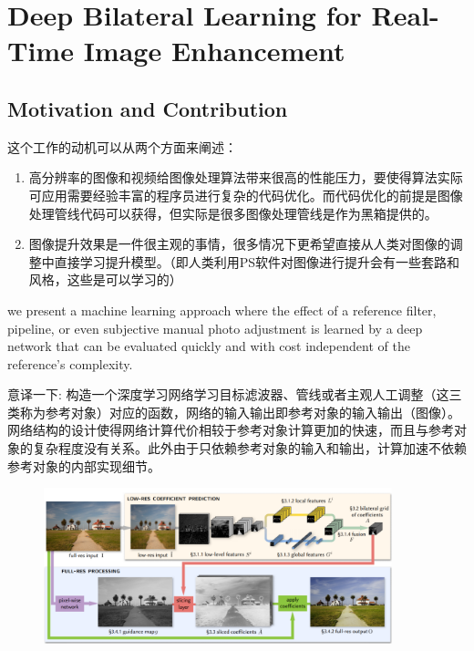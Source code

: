 \section{Deep Bilateral Learning for Real-Time Image Enhancement}
\label{sec:gharbi2017deep}

\subsection{Motivation and Contribution}

这个工作的动机可以从两个方面来阐述：

\begin{enumerate}
\item
  高分辨率的图像和视频给图像处理算法带来很高的性能压力，要使得算法实际可应用需要经验丰富的程序员进行复杂的代码优化。而代码优化的前提是图像处理管线代码可以获得，但实际是很多图像处理管线是作为黑箱提供的。
\item
  图像提升效果是一件很主观的事情，很多情况下更希望直接从人类对图像的调整中直接学习提升模型。（即人类利用PS软件对图像进行提升会有一些套路和风格，这些是可以学习的）
\end{enumerate}

we present a machine learning approach where the effect of a reference
filter, pipeline, or even subjective manual photo adjustment is learned
by a deep network that can be evaluated quickly and with cost
independent of the reference's complexity.

意译一下:
构造一个深度学习网络学习目标滤波器、管线或者主观人工调整（这三类称为参考对象）对应的函数，网络的输入输出即参考对象的输入输出（图像）。网络结构的设计使得网络计算代价相较于参考对象计算更加的快速，而且与参考对象的复杂程度没有关系。此外由于只依赖参考对象的输入和输出，计算加速不依赖参考对象的内部实现细节。

\begin{figure}
\centering
\includegraphics[width=0.9\textwidth]{./images/DeepBilateralLearning01.png}
\caption{}
\end{figure}

